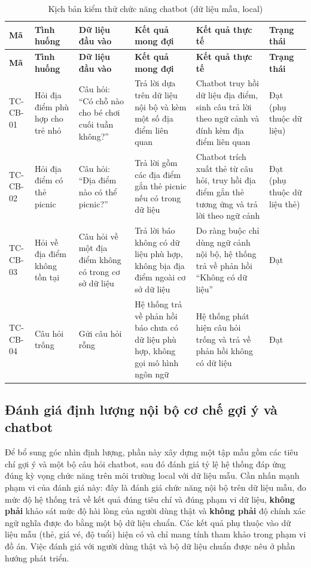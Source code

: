 ﻿\documentclass[../DoAn.tex]{subfiles}
\begin{document}
\begin{landscape}
\begin{longtable}{|L{1.4cm}|L{3.4cm}|L{4.0cm}|L{4.6cm}|L{4.6cm}|L{1.7cm}|}
\caption{Kịch bản kiểm thử chức năng chatbot (dữ liệu mẫu, local)}
\label{tab:test-chatbot}\\
\hline
\textbf{Mã} & \textbf{Tình huống} & \textbf{Dữ liệu đầu vào} & \textbf{Kết quả mong đợi} & \textbf{Kết quả thực tế} & \textbf{Trạng thái} \\
\hline
\endfirsthead
\hline
\textbf{Mã} & \textbf{Tình huống} & \textbf{Dữ liệu đầu vào} & \textbf{Kết quả mong đợi} & \textbf{Kết quả thực tế} & \textbf{Trạng thái} \\
\hline
\endhead
TC-CB-01 & Hỏi địa điểm phù hợp cho trẻ nhỏ & Câu hỏi: ``Có chỗ nào cho bé chơi cuối tuần không?'' & Trả lời dựa trên dữ liệu nội bộ và kèm một số địa điểm liên quan & Chatbot truy hồi dữ liệu địa điểm, sinh câu trả lời theo ngữ cảnh và đính kèm địa điểm liên quan & Đạt (phụ thuộc dữ liệu) \\
\hline
TC-CB-02 & Hỏi địa điểm có thẻ picnic & Câu hỏi: ``Địa điểm nào có thể picnic?'' & Trả lời gồm các địa điểm gắn thẻ picnic nếu có trong dữ liệu & Chatbot trích xuất thẻ từ câu hỏi, truy hồi địa điểm gắn thẻ tương ứng và trả lời theo ngữ cảnh & Đạt (phụ thuộc dữ liệu thẻ) \\
\hline
TC-CB-03 & Hỏi về địa điểm không tồn tại & Câu hỏi về một địa điểm không có trong cơ sở dữ liệu & Trả lời báo không có dữ liệu phù hợp, không bịa địa điểm ngoài cơ sở dữ liệu & Do ràng buộc chỉ dùng ngữ cảnh nội bộ, hệ thống trả về phản hồi ``Không có dữ liệu'' & Đạt \\
\hline
TC-CB-04 & Câu hỏi trống & Gửi câu hỏi rỗng & Hệ thống trả về phản hồi báo chưa có dữ liệu phù hợp, không gọi mô hình ngôn ngữ & Hệ thống phát hiện câu hỏi trống và trả về phản hồi không có dữ liệu & Đạt \\
\hline
\end{longtable}
\end{landscape}

\subsection{Đánh giá định lượng nội bộ cơ chế gợi ý và chatbot}
\label{sec:quant-eval}

Để bổ sung góc nhìn định lượng, phần này xây dựng một tập mẫu gồm các tiêu chí gợi ý và một bộ câu hỏi chatbot, sau đó đánh giá tỷ lệ hệ thống đáp ứng đúng kỳ vọng chức năng trên môi trường local với dữ liệu mẫu. Cần nhấn mạnh phạm vi của đánh giá này: đây là đánh giá chức năng nội bộ trên dữ liệu mẫu, đo mức độ hệ thống trả về kết quả đúng tiêu chí và đúng phạm vi dữ liệu, \textbf{không phải} khảo sát mức độ hài lòng của người dùng thật và \textbf{không phải} độ chính xác ngữ nghĩa được đo bằng một bộ dữ liệu chuẩn. Các kết quả phụ thuộc vào dữ liệu mẫu (thẻ, giá vé, độ tuổi) hiện có và chỉ mang tính tham khảo trong phạm vi đồ án. Việc đánh giá với người dùng thật và bộ dữ liệu chuẩn được nêu ở phần hướng phát triển.
\end{document}
